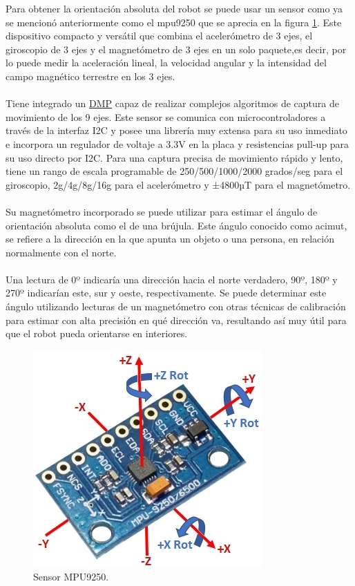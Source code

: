 Para obtener la orientación absoluta del robot se puede usar un sensor como ya se mencionó anteriormente como el mpu9250 que se aprecia en la figura \ref{fig:mpu9250}. Este dispositivo compacto y versátil que combina el acelerómetro de 3 ejes, el giroscopio de 3 ejes y el magnetómetro de 3 ejes en un solo paquete,es decir, por lo puede medir la aceleración lineal, la velocidad angular y la intensidad del campo magnético terrestre en los 3 ejes.\\ \\ Tiene integrado un \hyperlink{DMP}{DMP} capaz de realizar complejos algoritmos de captura de movimiento de los 9 ejes. Este sensor se comunica con microcontroladores a través de la interfaz I2C y posee una librería muy extensa para su uso inmediato e incorpora un regulador de voltaje a 3.3V en la placa y resistencias pull-up para su uso directo por I2C. Para una captura precisa de movimiento rápido y lento, tiene un rango de escala programable de 250/500/1000/2000 grados/seg para el giroscopio, 2g/4g/8g/16g para el acelerómetro y ±4800µT para el magnetómetro.\\ \\
Su magnetómetro incorporado se puede utilizar para estimar el ángulo de orientación absoluta como el de una brújula. Este ángulo conocido como acimut, se refiere a la dirección en la que apunta un objeto o una persona, en relación normalmente con el norte.\\ \\ Una lectura de 0º indicaría una dirección hacia el norte verdadero, 90º, 180º y 270º indicarían este, sur y oeste, respectivamente. Se puede determinar este ángulo utilizando lecturas de un magnetómetro con otras técnicas de calibración para estimar con alta precisión en qué dirección va, resultando así muy útil para que el robot pueda orientarse en interiores.



\begin{figure}[H]
  \centering
  \includegraphics[scale=0.7]{figs/mpu9250} %
  \caption{Sensor MPU9250.}
  \label{fig:mpu9250}
\end{figure}


